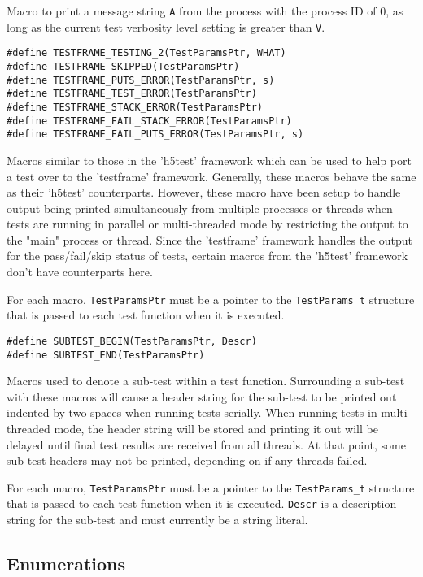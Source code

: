 \documentclass[../HDF5_RFC.tex]{subfiles}
\begin{document}
Macro to print a message string \texttt{A} from the process with the process ID of 0, as long as the current test verbosity level setting is greater than \texttt{V}.

\begin{verbatim}
#define TESTFRAME_TESTING_2(TestParamsPtr, WHAT)
#define TESTFRAME_SKIPPED(TestParamsPtr)
#define TESTFRAME_PUTS_ERROR(TestParamsPtr, s)
#define TESTFRAME_TEST_ERROR(TestParamsPtr)
#define TESTFRAME_STACK_ERROR(TestParamsPtr)
#define TESTFRAME_FAIL_STACK_ERROR(TestParamsPtr)
#define TESTFRAME_FAIL_PUTS_ERROR(TestParamsPtr, s)
\end{verbatim}

Macros similar to those in the 'h5test' framework which can be used to help port a test over to
the 'testframe' framework. Generally, these macros behave the same as their 'h5test' counterparts.
However, these macro have been setup to handle output being printed simultaneously from multiple
processes or threads when tests are running in parallel or multi-threaded mode by restricting the
output to the "main" process or thread. Since the 'testframe' framework handles the output for the
pass/fail/skip status of tests, certain macros from the 'h5test' framework don't have counterparts
here.

For each macro, \texttt{TestParamsPtr} must be a pointer to the \texttt{TestParams\_t} structure
that is passed to each test function when it is executed.

\begin{verbatim}
#define SUBTEST_BEGIN(TestParamsPtr, Descr)
#define SUBTEST_END(TestParamsPtr)
\end{verbatim}

Macros used to denote a sub-test within a test function. Surrounding a sub-test with these macros
will cause a header string for the sub-test to be printed out indented by two spaces when running
tests serially. When running tests in multi-threaded mode, the header string will be stored and
printing it out will be delayed until final test results are received from all threads. At that
point, some sub-test headers may not be printed, depending on if any threads failed.

For each macro, \texttt{TestParamsPtr} must be a pointer to the \texttt{TestParams\_t} structure
that is passed to each test function when it is executed. \texttt{Descr} is a description string
for the sub-test and must currently be a string literal.

\subsection{Enumerations}
\end{document}

